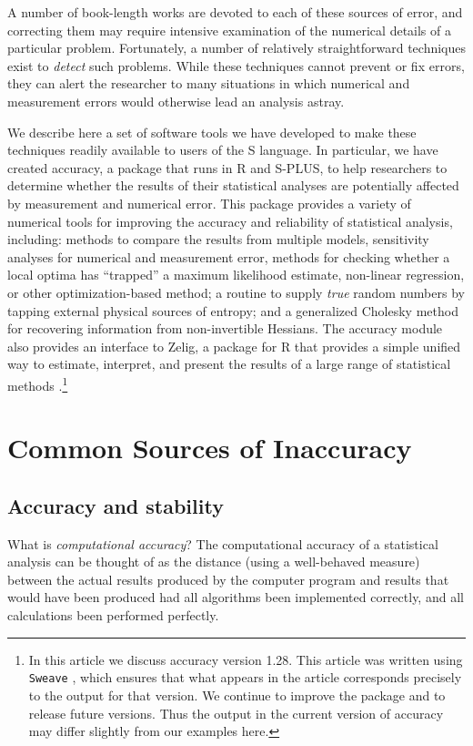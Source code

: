 \documentclass[11pt]{article}
\let\code=\texttt
\let\proglang=\textsf
\newcommand{\pkg}[1]{{\normalfont\fontseries{b}\selectfont #1}}
\begin{document}
A number of book-length works are devoted to each of these sources of error, and correcting them may require 
intensive examination of the numerical details of a particular problem. Fortunately, a number of 
relatively straightforward techniques exist to \emph{detect} such problems. While these techniques cannot 
prevent or fix errors, they can alert the researcher to many situations in which numerical and measurement 
errors would otherwise lead an analysis astray. 
 
We describe here a set of software tools we have developed to make these techniques 
readily available to users of the \proglang{S} language. In particular, we have created \pkg{accuracy},
 a package that runs in \proglang{R}  
\citep{R07} and \proglang{S-PLUS}, to help researchers to
determine whether the results of their statistical analyses are potentially affected by measurement and 
numerical error. This package provides a variety of numerical tools for improving 
the accuracy and reliability of statistical analysis, including: methods to compare the
results from multiple models, sensitivity analyses for numerical and measurement error,
 methods for checking whether a local optima has ``trapped'' a maximum likelihood estimate, 
non-linear regression, or other optimization-based method; a routine to supply \emph{true} random 
numbers by tapping external physical sources of entropy; and a generalized Cholesky method for 
recovering information from non-invertible Hessians. The \pkg{accuracy} module also provides an interface 
to \pkg{Zelig}, a package for \proglang{R} that provides a simple unified way to estimate, 
interpret, and present the results of a large range of statistical methods 
\citep{Zelig07}.\footnote{In this article we discuss \pkg{accuracy} version 1.28. This article 
	was written using \code{Sweave} \citep{Leisch02}, which ensures that what appears in the article corresponds 
	precisely to the output for that version. We continue to improve the package and to release future 
	versions. Thus the output in the current version of accuracy may differ slightly from our examples 
	here.}
  
\section{Common Sources of Inaccuracy}

\subsection{Accuracy and stability}
What is \emph{computational accuracy}? The computational accuracy of a statistical analysis can be thought of 
as the distance (using a well-behaved measure) between the actual results produced by the computer program and results that would have been produced had all algorithms been
implemented correctly, and all calculations been performed perfectly. 
 
\end{document}
